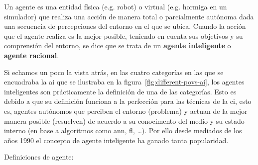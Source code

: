 Un agente es una entidad física (e.g. robot) o virtual (e.g. hormiga en un simulador) que realiza una acción de manera total o parcialmente autónoma dada una secuencia de percepciones del entorno en el que se ubica. Cuando la acción que el agente realiza es la mejor posible, teniendo en cuenta sus objetivos y su comprensión del entorno, se dice que se trata de un \textbf{agente inteligente} o \textbf{agente racional}.

Si echamos un poco la vista atrás, en las cuatro categorías en las que se encuadraba la \ac{ai} que se ilustraba en la figura~\ref{fig:different-povs-ai}, los agentes inteligentes son prácticamente la definición de una de las categorías. Esto es debido a que su definición funciona a la perfección para las técnicas de la \ac{ci}, esto es, agentes autónomos que perciben el entorno (problema) y actuan de la mejor manera posible (resuelven) de acuerdo a su conocimento del medio y su estado interno (en base a algoritmos como \ac{ann}, \ac{fl}, \ldots). Por ello desde mediados de los años 1990 el concepto de agente inteligente ha ganado tanta popularidad.

Definiciones de agente:

